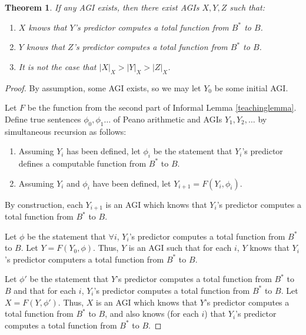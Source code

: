\documentclass{article}
\newtheorem{theorem}{Theorem}
\begin{document}
\begin{theorem}
\label{nonarchimedeantheorem}
    If any AGI exists, then
    there exist AGIs $X,Y,Z$ such that:
    \begin{enumerate}
        \item $X$ knows that $Y$'s predictor computes a total function from $B^*$ to $B$.
        \item $Y$ knows that $Z$'s predictor computes a total function from $B^*$ to $B$.
        \item It is \emph{not} the case that $|X|_X>|Y|_X>|Z|_X$.
    \end{enumerate}
\end{theorem}

\begin{proof}
    By assumption, some AGI exists, so we may let $Y_0$ be some initial AGI.

    Let $F$ be the function from the second part of Informal Lemma \ref{teachinglemma}.
    Define true sentences $\phi_0,\phi_1\ldots$ of Peano arithmetic and
    AGIs $Y_1,Y_2,\ldots$ by simultaneous recursion as follows:
    \begin{enumerate}
        \item
        Assuming $Y_i$ has been defined,
        let $\phi_i$ be the statement that $Y_i$'s predictor defines a computable
        function from $B^*$ to $B$.
        \item
        Assuming $Y_{i}$ and $\phi_{i}$ have been defined,
        let $Y_{i+1}=F(Y_{i},\phi_{i})$.
    \end{enumerate}
    By construction, each $Y_{i+1}$ is an AGI which
    knows that $Y_i$'s predictor computes a total function from $B^*$ to $B$.

    Let $\phi$ be the statement that $\forall i$, $Y_i$'s predictor computes a total
    function from $B^*$ to $B$.
    Let $Y=F(Y_0,\phi)$.
    Thus, $Y$ is an AGI such that for each $i$, $Y$ knows that $Y_i$'s predictor
    computers a total function from $B^*$ to $B$.

    Let $\phi'$ be the statement that $Y$'s predictor computes a total function
    from $B^*$ to $B$ and that for each $i$, $Y_i$'s predictor computes a total
    function from $B^*$ to $B$.
    Let $X=F(Y,\phi')$.
    Thus, $X$ is an AGI which knows that $Y$'s predictor computes a total function from
    $B^*$ to $B$, and also knows (for each $i$) that $Y_i$'s predictor computes a total
    function from $B^*$ to $B$.


\end{proof}
\end{document}
